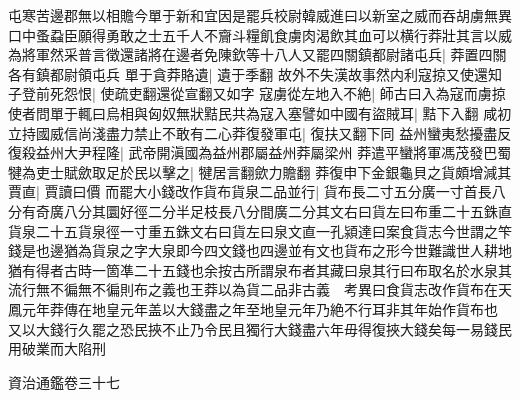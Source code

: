 屯寒苦邊郡無以相贍今單于新和宜因是罷兵校尉韓威進曰以新室之威而吞胡虜無異口中蚤蝨臣願得勇敢之士五千人不齎斗糧飢食虜肉渴飲其血可以横行莽壯其言以威為將軍然采普言徵還諸將在邊者免陳欽等十八人又罷四關鎮都尉諸屯兵|{
	莽置四關各有鎮都尉領屯兵}
單于貪莽賂遺|{
	遺于季翻}
故外不失漢故事然内利寇掠又使還知子登前死怨恨|{
	使疏吏翻還從宣翻又如字}
寇虜從左地入不絶|{
	師古曰入為寇而虜掠}
使者問單于輒曰烏相與匈奴無狀黠民共為寇入塞譬如中國有盜賊耳|{
	黠下入翻}
咸初立持國威信尚淺盡力禁止不敢有二心莽復發軍屯|{
	復扶又翻下同}
益州蠻夷愁擾盡反復殺益州大尹程隆|{
	武帝開滇國為益州郡屬益州莽屬梁州}
莽遣平蠻將軍馮茂發巴蜀犍為吏士賦歛取足於民以擊之|{
	犍居言翻歛力贍翻}
莽復申下金銀龜貝之貨頗增減其賈直|{
	賈讀曰價}
而罷大小錢改作貨布貨泉二品並行|{
	貨布長二寸五分廣一寸首長八分有奇廣八分其圜好徑二分半足枝長八分間廣二分其文右曰貨左曰布重二十五銖直貨泉二十五貨泉徑一寸重五銖文右曰貨左曰泉文直一孔潁達曰案食貨志今世謂之笇錢是也邊猶為貨泉之字大泉即今四文錢也四邊並有文也貨布之形今世難識世人耕地猶有得者古時一箇凖二十五錢也余按古所謂泉布者其藏曰泉其行曰布取名於水泉其流行無不徧無不徧則布之義也王莽以為貨二品非古義　考異曰食貨志改作貨布在天鳳元年莽傳在地皇元年盖以大錢盡之年至地皇元年乃絶不行耳非其年始作貨布也}
又以大錢行久罷之恐民挾不止乃令民且獨行大錢盡六年毋得復挾大錢矣每一易錢民用破業而大陷刑

資治通鑑卷三十七
